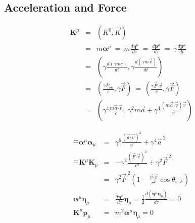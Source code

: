 \documentclass[12pt]{article}
\newcommand*{\dotP}{\boldsymbol \cdot}				%
\newcommand*{\contra}[1]{\boldsymbol {#1}^{\mu}}	%
\newcommand*{\covar}[1]{\boldsymbol {#1}_{\mu}}		%
\begin{document}
\subsection{Acceleration and Force}
\vspace{-5pt}
\begin{minipage}{0.49\textwidth}
	\begin{eqnarray*}
	\contra{K} &=& (K^0, \vec{K}) \\
		&=& m\contra{\alpha} \ =\ m\frac{d\contra{\eta}}{d\tau} \ =\ \frac{d\contra{p}}{d\tau} \ = \ \gamma \frac{d\contra{p}}{dt}\\[5pt]
		&=& \left( \gamma \frac{d(\gamma mc)}{dt}, \gamma \frac{d(\gamma m\vec{v})}{dt} \right) \\[5pt]
		&=& \left( \tfrac{\gamma P_\text{ow}}{c}, \gamma \vec{F} \right) \ =\ 
			\left( \tfrac{\gamma \vec{F} \dotP \vec{v}}{c}, \gamma \vec{F} \right)\\[5pt]
		&=& \left( \gamma^4 \tfrac{m\vec{a} \dotP \vec{v}}{c} , \ 
			\gamma^2 m\vec{a} + \gamma^4 \tfrac{(m\vec{a}\dotP \vec{v})\vec{v}}{c^2} \right)
	\end{eqnarray*}
\end{minipage}
\hfill
\begin{minipage}{0.49\textwidth}
	\begin{eqnarray*}
	\mp \contra{\alpha}\covar{\alpha} &=& \gamma^6 \tfrac{(\vec{a} \dotP \vec{v})^2}{c^2} + \gamma^4 \vec{a}^{\ 2} \\[5pt]
	\mp \contra{K}\covar{K} &=& - \gamma^2 \tfrac{(\vec{F} \dotP \vec{v})^2}{c^2} + \gamma^2 \vec{F}^{\ 2}\\[5pt]
		&=& \gamma^2 \vec{F}^{\ 2} \left( 1-\tfrac{\vec{v}\dotP\vec{v}}{c^2}\cos{\theta_{v,F}} \right) \\[5pt]
	\contra{\alpha}\covar{\eta} &=& \frac{d\contra{\eta}}{d\tau}\covar{\eta} = \frac{1}{2} \frac{d(\contra{\eta}\covar{\eta})}{d\tau} = 0 \\[5pt]
	\contra{K}\covar{p} &=& m^2\contra{\alpha}\covar{\eta} = 0
 	\end{eqnarray*}
\end{minipage}

\end{document}

